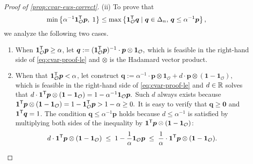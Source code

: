 \documentclass[10pt]{article} %
\begin{document}
\begin{proof}[Proof of \cref{prop:cvar-ews-correct}]
(ii) To prove that 
\begin{equation} \label{eq:cvar-proof-le}
\min\left\{ \alpha^{-1} \bm{1}_{\mathcal{O}}^{\mathsf{T}} \bm{p},\; 1 \right\}
\le \max \left\{ \bm{1}_{\mathcal{O}}^{\mathsf{T}} \bm{q} \mid \bm{q} \in \Delta_{n}, \, \bm{q} \le \alpha^{-1} \bm{p}
\right\},
\end{equation}
we analyze the following two cases.
\begin{enumerate}[nosep]
\item[(a)] When $\bm{1}_{\mathcal{O}}^{\mathsf{T}}  \bm{p} \ge \alpha$, let \(\bm{q} :=  (\bm{1}_{\mathcal{O}}^{\mathsf{T}} \bm{p})^{-1} \cdot \bm{p} \otimes \bm{1}_{\mathcal{O}},
\) which is
feasible in the right-hand side of \eqref{eq:cvar-proof-le} and $\otimes$ is the Hadamard vector product. 
\item[(b)] When that $\bm{1}_{\mathcal{O}}^{\mathsf{T}}  \bm{p} < \alpha$, let construct \(\bm{q} := \alpha^{-1} \cdot \bm{p} \otimes \bm{1}_{\mathcal{O}}
+  d \cdot \bm{p} \otimes (\bm{1} - \bm{1}_{\mathcal{O}}), \) which is
feasible in the right-hand side of \eqref{eq:cvar-proof-le} and $d\in \mathbb{R} $ solves that
\(d \cdot \bm{1}^{\mathsf{T}} \bm{p} \otimes (\bm{1} - \bm{1}_{\mathcal{O}}) = 1 - \alpha^{-1} \bm{1}_{\mathcal{O}} \bm{p}.
\)
Such $d$ always exists because \(\bm{1}^{\mathsf{T}} \bm{p} \otimes (\bm{1} - \bm{1}_{\mathcal{O}}) = 1 - \bm{1}_{\mathcal{O}}^{\mathsf{T}} \bm{p}  > 1 - \alpha \ge 0.
\)
It is easy to verify that $\bm{q} \ge \bm{0}$ and $\bm{1}^{\mathsf{T}} \bm{q} = 1$. The condition $\bm{q} \le \alpha^{-1} \bm{p}$ holds because $d \le \alpha^{-1}$ is satisfied by multiplying both sides of the inequality by $\bm{1}^{\mathsf{T}} \bm{p} \otimes (\bm{1} - \bm{1}_{\mathcal{O}})$:
\[
  d \cdot \bm{1}^{\mathsf{T}} \bm{p} \otimes (\bm{1} - \bm{1}_{\mathcal{O}})
  \; \le\; 
  1 - \frac{1}{\alpha } \bm{1}_{\mathcal{O}} \bm{p}
  \; \le\; 
  \frac{1}{\alpha } \cdot \bm{1}^{\mathsf{T}} \bm{p} \otimes (\bm{1} - \bm{1}_{\mathcal{O}}).
\]
\end{enumerate}
\end{proof}
\end{document}
